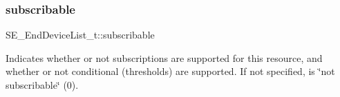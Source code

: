 \subsubsection{\texorpdfstring{subscribable}{subscribable}}
{\footnotesize\ttfamily S\+E\+\_\+\+End\+Device\+List\+\_\+t\+::subscribable}

Indicates whether or not subscriptions are supported for this resource, and whether or not conditional (thresholds) are supported. If not specified, is \char`\"{}not subscribable\char`\"{} (0). 